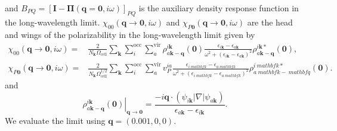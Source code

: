 and $B_{PQ}=[\mathbf{I}-\boldsymbol{\Pi}(\mathbf{q}=\mathbf{0}, i \omega)]_{PQ}$ is the auxiliary density response function in the long-wavelength limit.
$\chi_{00}(\mathbf{q} \rightarrow \mathbf{0}, i \omega)$ and $\chi_{P \mathbf{0}}(\mathbf{q} \rightarrow \mathbf{0}, i \omega)$ are the head and wings of the polarizability in the long-wavelength limit given by
\begin{align}
\chi_{00}(\mathbf{q} \rightarrow \mathbf{0}, i \omega)= & \frac{2}{N_{\mathbf{k}} \Omega_{\mathrm{cell}}} \sum_{\mathbf{k}} \sum_i^{\mathrm{occ}} \sum_a^{\mathrm{vir}} \rho_{a \mathbf{k}-\mathbf{q}}^{i \mathbf{k}}(\mathbf{0}) \frac{\epsilon_{i \mathbf{k}}-\epsilon_{a \mathbf{k}}}{\omega^2+\left(\epsilon_{i \mathbf{k}}-\epsilon_{a \mathbf{k}}\right)^2} \rho_{a \mathbf{k}-\mathbf{q}}^{i \mathbf{k} *}(\mathbf{0}), \\
\chi_{P \mathbf{0}}(\mathbf{q} \rightarrow \mathbf{0}, i \omega)= & \frac{2}{N_{\mathbf{k}} \Omega_{\mathrm{cell}}^{1 / 2}} \sum_{\mathbf{k}} \sum_i^{\mathrm{occ}} \sum_a^{\mathrm{vir}} v_P^{i a} \frac{\epsilon_{i \ mathbf{k}}-\epsilon_{a \ mathbf{k}}}{\omega^2+\left(\epsilon_{i \ mathbf{k}}-\epsilon_{a \ mathbf{k}}\right)^2} \rho_{a \ mathbf{k}-\ mathbf{q}}^{i \ mathbf{k} *}(\mathbf{0}) .
\end{align}
and 
\begin{equation}
    \left.\rho_{a \mathbf{k}-\mathbf{q}}^{i \mathbf{k}}(\mathbf{0})\right|_{\mathbf{q} \rightarrow \mathbf{0}}=\frac{-i \mathbf{q} \cdot\left(\psi_{i \mathbf{k}}|\nabla| \psi_{a \mathbf{k}}\right)}{\epsilon_{a \mathbf{k}}-\epsilon_{i \mathbf{k}}}.
\end{equation}
We evaluate the limit using $\mathbf{q}=(0.001,0,0)$.
